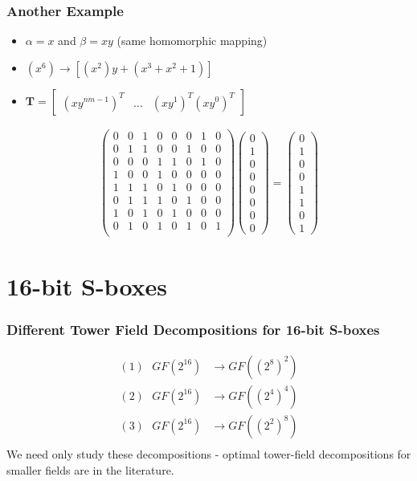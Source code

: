 \documentclass[handout]{beamer}
\begin{document}
\begin{frame}
\frametitle{Another Example}
\begin{itemize}
	\item $\alpha = x$ and $\beta = xy$ (same homomorphic mapping)
	\item $(x^6) \to [(x^2)y + (x^3 + x^2 + 1)]$
	\item $\textbf{T} =  \left[ \begin{array}{cccc}
(xy^{nm - 1})^T & \dots & (xy^{1})^T (xy^{0})^T \end{array} \right]$
\end{itemize}

\begin{align*}
\left( \begin{array}{cccccccc}
0 & 0 & 1 & 0 & 0 & 0 & 1 & 0 \\
0 & 1 & 1 & 0 & 0 & 1 & 0 & 0 \\
0 & 0 & 0 & 1 & 1 & 0 & 1 & 0 \\
1 & 0 & 0 & 1 & 0 & 0 & 0 & 0 \\
1 & 1 & 1 & 0 & 1 & 0 & 0 & 0 \\
0 & 1 & 1 & 1 & 0 & 1 & 0 & 0 \\
1 & 0 & 1 & 0 & 1 & 0 & 0 & 0 \\
0 & 1 & 0 & 1 & 0 & 1 & 0 & 1 \\ \end{array} \right) \left( \begin{array}{c}
0 \\
1 \\
0 \\ 
0 \\
0 \\ 
0 \\
0 \\ 
0 \end{array} \right) = \left( \begin{array}{c}
0 \\
1 \\
0 \\ 
0 \\
1 \\ 
1 \\
0 \\ 
1 \end{array} \right)
\end{align*}
\end{frame}

\section{16-bit S-boxes}
\begin{frame}
	\frametitle{Different Tower Field Decompositions for 16-bit S-boxes}
	\begin{align*}
	(1)\text{ } GF(2^{16}) & \to GF((2^8)^2) \\ 
	(2)\text{ } GF(2^{16}) & \to GF((2^4)^4) \\ 
	(3)\text{ } GF(2^{16}) & \to GF((2^2)^8) \\
	\end{align*}
	We need only study these decompositions - optimal tower-field decompositions for smaller fields are in the literature.
\end{frame}
\end{document}
